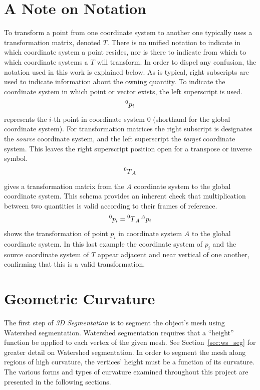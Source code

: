 \vspace{1cm} %
\section{A Note on Notation}
To transform a point from one coordinate system to another one typically uses a transformation matrix, denoted $T$.
There is no unified notation to indicate in which coordinate system a point resides, nor is there to indicate from which to which coordinate systems a $T$ will transform.
In order to dispel any confusion, the notation used in this work is explained below.
As is typical, right subscripts are used to indicate information about the owning quantity.
To indicate the coordinate system in which point or vector exists, the left superscript is used.
\begin{equation*}
	\prescript{0}{}p_i
\end{equation*}
represents the $i$-th point in coordinate system 0 (shorthand for the global coordinate system).
For transformation matrices the right subscript is designates the \textit{source} coordinate system, and the left superscript the \textit{target} coordinate system.
This leaves the right superscript position open for a transpose or inverse symbol.
\begin{equation*}
	\prescript{0}{}T_{A}
\end{equation*}
gives a transformation matrix from the \textit{A} coordinate system to the global coordinate system.
This schema provides an inherent check that multiplication between two quantities is valid according to their frames of reference.
\begin{equation*}
	\prescript{0}{}p_i = \prescript{0}{}T_{A} \prescript{A}{}p_i
\end{equation*}
shows the transformation of point $p_i$ in coordinate system $A$ to the global coordinate system.
In this last example the coordinate system of $p_i$ and the source coordinate system of $T$ appear adjacent and near vertical of one another, confirming that this is a valid transformation.

\section{Geometric Curvature}
The first step of \textit{3D Segmentation} is to segment the object's mesh using Watershed segmentation.
Watershed segmentation requires that a ``height'' function be applied to each vertex of the given mesh.
See Section~\ref{sec:ws_seg} for greater detail on Watershed segmentation.
In order to segment the mesh along regions of high curvature, the vertices' height must be a function of its curvature.
The various forms and types of curvature examined throughout this project are presented in the following sections.

